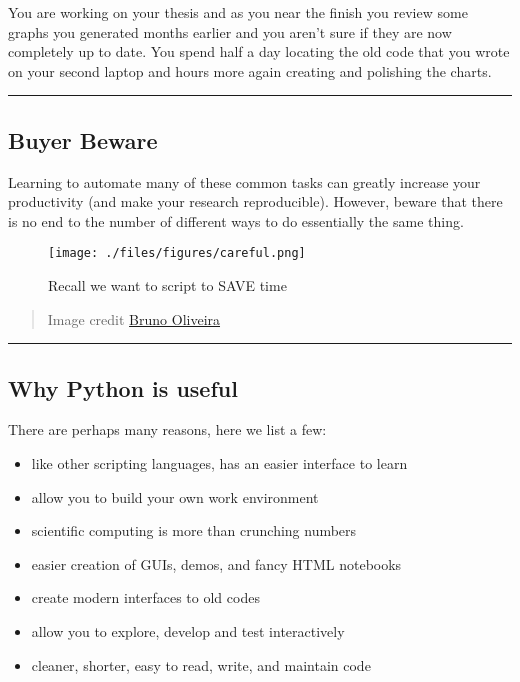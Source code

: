 \documentclass{article}
\begin{document}
You are working on your thesis and as you near the finish you review
some graphs you generated months earlier and you aren't sure if they are
now completely up to date. You spend half a day locating the old code
that you wrote on your second laptop and hours more again creating and
polishing the charts.

    \begin{center}\rule{3in}{0.4pt}\end{center}

\subsection{Buyer Beware}\label{buyer-beware}

Learning to automate many of these common tasks can greatly increase
your productivity (and make your research reproducible). However, beware
that there is no end to the number of different ways to do essentially
the same thing.

\begin{figure}[htbp]
\centering
\texttt{[image: ./files/figures/careful.png]}
\caption{Recall we want to script to SAVE time}
\end{figure}

\begin{quote}
Image credit
\href{https://plus.google.com/102451193315916178828/posts/MGxauXypb1Y}{Bruno
Oliveira}
\end{quote}

    \begin{center}\rule{3in}{0.4pt}\end{center}

\subsection{Why Python is useful}\label{why-python-is-useful}

There are perhaps many reasons, here we list a few:

\begin{itemize}
\itemsep1pt\parskip0pt
\item
  like other scripting languages, has an easier interface to learn
\item
  allow you to build your own work environment
\item
  scientific computing is more than crunching numbers
\item
  easier creation of GUIs, demos, and fancy HTML notebooks
\item
  create modern interfaces to old codes
\item
  allow you to explore, develop and test interactively
\item
  cleaner, shorter, easy to read, write, and maintain code
\end{itemize}
\end{document}
